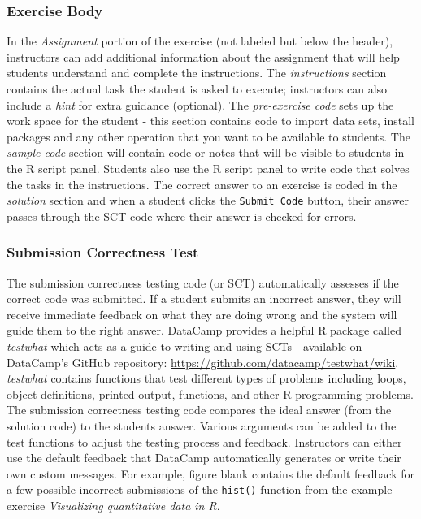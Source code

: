 \documentclass[12pt]{article}\usepackage[]{graphicx}\usepackage[]{color}
\begin{document}
\subsubsection{Exercise Body}
In the \textit{Assignment} portion of the exercise (not labeled but below the header), instructors can add additional information about the assignment that will help
students understand and complete the instructions. The \textit{instructions} section contains the actual task the student is
asked to execute; instructors can also include a \textit{hint} for extra guidance (optional). The \textit{pre-exercise code} sets up the work space for 
the student - this section contains code to import data sets, install packages and any other operation that you want to be available to
students. The \textit{sample code} section will contain code or notes that will be visible to students in the R script panel. Students also use the R script panel to write code that solves the tasks in the instructions. The correct answer to an exercise is coded in the \textit{solution} section
and when a student clicks the \texttt{Submit Code} button, their answer passes through the SCT code where their answer is checked for errors.

\subsubsection{Submission Correctness Test}
The submission correctness testing code (or SCT) automatically assesses if the correct code was submitted. If a student submits an 
incorrect answer, they will receive immediate feedback on what they are doing wrong and the system will guide them to the right answer.
DataCamp provides a helpful R package called \textit{testwhat} which acts as a guide to writing and using SCTs - available on DataCamp's GitHub 
repository: \url{https://github.com/datacamp/testwhat/wiki}. 
\textit{testwhat} contains functions that test different types of problems including loops, object definitions, printed output, functions, and other R programming problems.
The submission correctness testing code compares the ideal answer (from the solution code) to the students answer. Various
arguments can be added to the test functions to adjust the testing process and feedback.
Instructors can either use the default feedback that DataCamp automatically generates or write their own custom messages. For example, figure blank
contains the default feedback for a few possible incorrect submissions of the \texttt{hist()} function from the example exercise \textit{Visualizing quantitative data in R}.
\end{document}
